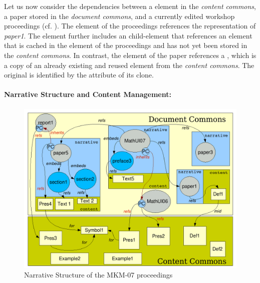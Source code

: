 \documentclass[a4paper]{article}
\begin{document}
Let us now consider the dependencies between a {} element in the
{\emph{content commons}}, a paper stored in the {\emph{document commons}}, and a currently
edited workshop proceedings (cf. ). The {} element of the proceedings
references the {\omdoc} representation of {\emph{paper1}}. The {}
element further includes an {} child-element that references an
{} element that is cached in the {} element of the
proceedings and has not yet been stored in the {\emph{content commons}}. In contrast, the
{} element of the paper references a {}, which is a
copy of an already existing and reused element from the {\emph{content commons}}. The
original {} is identified by the {} attribute of its
clone.


\paragraph{Narrative Structure and Content Management:}
\begin{figure}[ht]
\includegraphics[width=.47\textwidth]{img/narcon.png}
\caption{Narrative Structure of the MKM-07 proceedings}\label{fig:narcon}
\end{figure}
\end{document}
